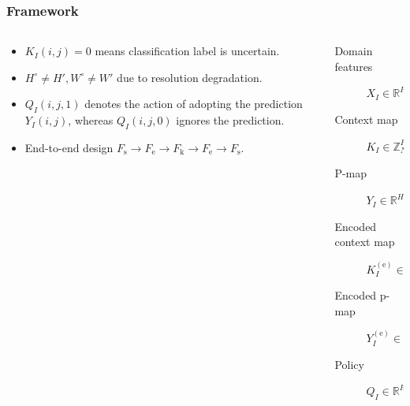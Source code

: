 \documentclass[12pt, aspectratio = 169, xcolor = x11names]{beamer}
\begin{document}
\begin{frame}
  \frametitle{Framework}
  \begin{columns}
    \begin{column}{0.45\textwidth}
      \begin{itemize}[<+->]
        \item$K_I(i, j) = 0$ means classification label is uncertain.
        \item$H^\circ \neq H', W^\circ \neq W'$ due to resolution
          degradation.
        \item$Q_I(i, j, 1)$ denotes the action of adopting the prediction
          $Y_I(i, j)$, whereas $Q_I(i, j, 0)$ ignores the prediction.
        \item<+-|alert@+>End-to-end design $F_\mathrm{s} \rightarrow
          F_\mathrm{e} \rightarrow F_\mathrm{k} \rightarrow
          F_\mathrm{e} \rightarrow F_\mathrm{s}$.
      \end{itemize}
    \end{column}
    \begin{column}{0.55\textwidth}
      \begin{description}
        \item[Domain features]$X_I \in \mathbb{R}^{H' \times W' \times C}$
        \item[Context map]$K_I \in \mathbb{Z}_{N_\mathrm{c}}^{H' \times W'}$
        \item[P-map]$Y_I \in \mathbb{R}^{H^\circ \times W^\circ}$
        \item[Encoded context map]$K_I^{(\mathrm{e})} \in \mathbb{R}^{H'
          \times W' \times C_\mathrm{e}}$
        \item[Encoded p-map]$Y_I^{(\mathrm{e})} \in \mathbb{R}^{H^\circ
          \times W^\circ \times C_\mathrm{e}}$
        \item[Policy]$Q_I \in \mathbb{R}^{H^\circ \times W^\circ \times 2}$
      \end{description}
    \end{column}
  \end{columns}
\end{frame}
\end{document}

